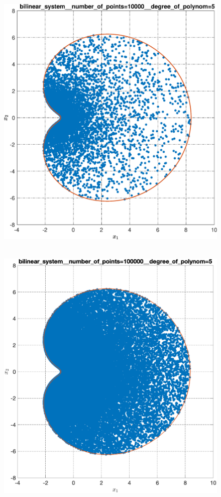 \documentclass[../main.tex]{subfiles}
\begin{document}
\begin{figure}[ht!]
\begin{minipage}[b]{.49\linewidth}
  		\includegraphics[width=\linewidth]{images/bilinear_system__number_of_points=10000__degree_of_polynom=5.eps}
  	\end{minipage} 
  	\vfill
  	\hspace{-2.5ex}
  	\begin{minipage}[b]{.49\linewidth} 
  		\small
  		\centering 
  		\includegraphics[width=\linewidth]{images/bilinear_system__number_of_points=100000__degree_of_polynom=5.eps}

\end{minipage}
\end{figure}
\end{document}
